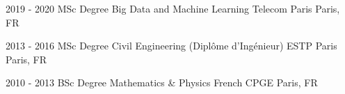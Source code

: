

\begin{cveducations}

  \cveducation
    {2019 - 2020} %
    {MSc Degree} %
    {Big Data and Machine Learning} %
    {Telecom Paris} %
    {Paris, FR} %

  \cveducation
  {2013 - 2016} %
  {MSc Degree}
  {Civil Engineering (Dipl\^ome d'Ing\'enieur)} %
  {ESTP Paris} %
  {Paris, FR} %

\cveducation
{2010 - 2013} %
{BSc Degree}
{Mathematics \& Physics} %
{French CPGE} %
{Paris, FR} %

\end{cveducations}


